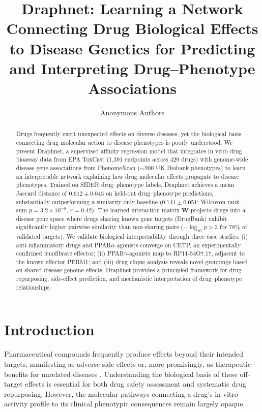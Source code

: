 \documentclass[11pt]{article}
\title{Draphnet: Learning a Network Connecting Drug Biological Effects to Disease Genetics for Predicting and Interpreting Drug--Phenotype Associations}
\author{Anonymous Authors}
\date{}
\begin{document}
\maketitle

\begin{abstract}
Drugs frequently exert unexpected effects on diverse diseases, yet the biological basis connecting drug molecular action to disease phenotypes is poorly understood. We present Draphnet, a supervised affinity regression model that integrates in vitro drug bioassay data from EPA ToxCast (1,391 endpoints across 429 drugs) with genome-wide disease gene associations from PhenomeXcan ($\sim$200 UK Biobank phenotypes) to learn an interpretable network explaining how drug molecular effects propagate to disease phenotypes. Trained on SIDER drug--phenotype labels, Draphnet achieves a mean Jaccard distance of $0.612 \pm 0.043$ on held-out drug--phenotype predictions, substantially outperforming a similarity-only baseline ($0.741 \pm 0.051$; Wilcoxon rank-sum $p = 3.2 \times 10^{-8}$, $r = 0.42$). The learned interaction matrix $\mathbf{W}$ projects drugs into a disease gene space where drugs sharing known gene targets (DrugBank) exhibit significantly higher pairwise similarity than non-sharing pairs ($-\log_{10} p > 3$ for 78\% of validated targets). We validate biological interpretability through three case studies: (i) anti-inflammatory drugs and PPAR$\alpha$-agonists converge on CETP, an experimentally confirmed fenofibrate effector; (ii) PPAR$\gamma$-agonists map to RP11-54O7.17, adjacent to the known effector PERM1; and (iii) drug clique analysis reveals novel groupings based on shared disease genome effects. Draphnet provides a principled framework for drug repurposing, side-effect prediction, and mechanistic interpretation of drug--phenotype relationships.
\end{abstract}

\section{Introduction}

Pharmaceutical compounds frequently produce effects beyond their intended targets, manifesting as adverse side effects or, more promisingly, as therapeutic benefits for unrelated diseases \citep{pushpakom2019drug}. Understanding the biological basis of these off-target effects is essential for both drug safety assessment and systematic drug repurposing. However, the molecular pathways connecting a drug's in vitro activity profile to its clinical phenotypic consequences remain largely opaque.
\end{document}
